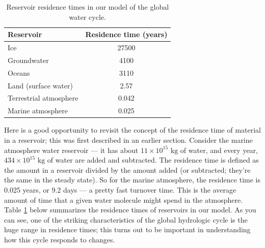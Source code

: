 \documentclass[11pt,letterpaper]{article}
\begin{document}
\begin{table}[h]
\caption{Reservoir residence times in our model of the global water cycle.\hspace{15cm}}
\begin{tabular}{lc}\\
\hline
Reservoir & Residence time (years)\\
\hline
Ice & 27500\\
Groundwater & 4100\\
Oceans & 3110\\
Land (surface water) & 2.57\\
Terrestrial atmosphere & 0.042\\
Marine atmosphere & 0.025\\
\hline
\end{tabular}
\label{table:residencetimes}
\end{table}

Here is a good opportunity to revisit the concept of the residence time of material in a reservoir; this was first described in an earlier section. Consider the marine atmosphere water reservoir --- it has about $11\times 10^{15}\mbox{ kg}$ of water, and every year, $434\times 10^{15}\mbox{ kg}$ of water are added and subtracted. The residence time is defined as the amount in a reservoir divided by the amount added (or subtracted; they're the same in the steady state). So for the marine atmosphere, the residence time is 0.025 years, or 9.2 days --- a pretty fast turnover time. This is the average amount of time that a given water molecule might spend in the atmosphere. Table \ref{table:residencetimes} below summarizes the residence times of reservoirs in our model. As you can see, one of the striking characteristics of the global hydrologic cycle is the huge range in residence times; this turns out to be important in understanding how this cycle responds to changes.
\end{document}
